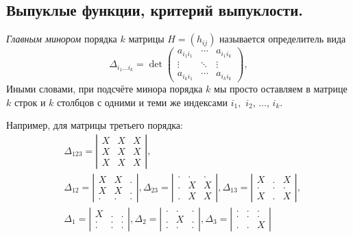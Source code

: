 \subsection{Выпуклые функции, критерий выпуклости.}
\begin{definition}
  \emph{Главным минором} порядка $ k $ матрицы $ H = (h_{ij}) $ называется
  определитель вида 
  \[
    \Delta_{i_1\ldots i_k} = \det \begin{pmatrix}
      a_{i_1i_1} & \cdots & a_{i_1i_k} \\
      \vdots & \ddots & \vdots \\
      a_{i_ki_1} & \cdots & a_{i_ki_k}
    \end{pmatrix},
  \]
 Иными словами, при подсчёте минора порядка $ k $ мы просто оставляем в матрице
 $ k $ строк и $ k $ столбцов с одними и теми же индексами $ i_1, $ $ i_2 $, $ \ldots $, $ i_k $.
\end{definition}

Например, для матрицы третьего порядка:
\begin{align*}
	&\Delta_{123}=\left|\begin{matrix}
		X & X & X \\
		X & X & X \\
		X & X & X 
	\end{matrix}\right|,\\
	&\Delta_{12}=\left|\begin{matrix}
	X & X & . \\
	X & X & . \\
	. & . & . 
	\end{matrix}\right|,
	\Delta_{23}=
	\left|\begin{matrix}
		. & . & . \\
		. & X & X \\
		. & X & X 
	\end{matrix}\right|,
	\Delta_{13}=
	\left|\begin{matrix}
		X & . & X \\
		. & . & . \\
		X & . & X 
	\end{matrix}\right|,\\
	&\Delta_{1}=
	\left|\begin{matrix}
	X & . & . \\
	. & . & . \\
	. & . & . 
	\end{matrix}\right|,
	\Delta_{2}=
	\left|\begin{matrix}
	. & . & . \\
	. & X & . \\
	. & . & . 
	\end{matrix}\right|,
	\Delta_{3}=
	\left|\begin{matrix}
	. & . & . \\
	. & . & . \\
	. & . & X 
	\end{matrix}\right|
\end{align*}

